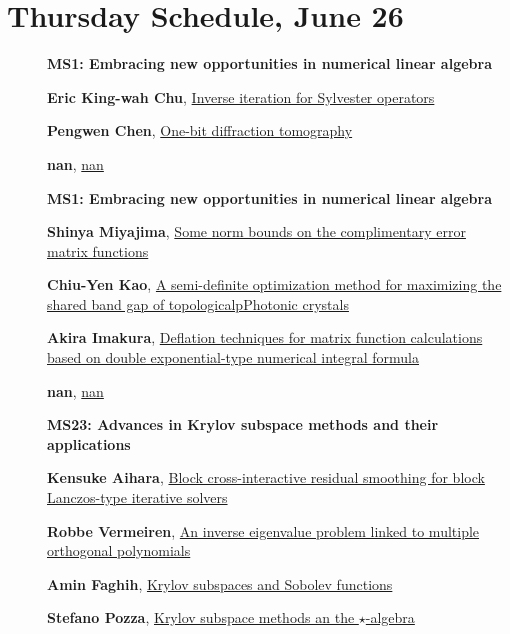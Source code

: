 \documentclass[ILAS2025-program.tex]{subfiles}
\begin{document}
\section*{Thursday Schedule, June 26 }
        
        \begin{description}
    \item[] {\color{mstitle}\textbf{MS1: Embracing new opportunities in numerical linear algebra}} 
    \item[] \hypertarget{up0304}{}\textbf{Eric King-wah Chu}, \hyperlink{down0304}{Inverse iteration for Sylvester operators
}
        \item[] \hypertarget{up0305}{}\textbf{Pengwen Chen}, \hyperlink{down0305}{One-bit diffraction tomography}
        \item[] \hypertarget{up0306}{}\textbf{nan}, \hyperlink{down0306}{nan}
        \end{description}
    \begin{description}
    \item[] {\color{mstitle}\textbf{MS1: Embracing new opportunities in numerical linear algebra}} 
    \item[] \hypertarget{up0347}{}\textbf{Shinya Miyajima}, \hyperlink{down0347}{Some norm bounds on the complimentary error matrix functions}
        \item[] \hypertarget{up0348}{}\textbf{Chiu-Yen Kao}, \hyperlink{down0348}{A semi-definite optimization method for maximizing the shared band gap of topologicalpPhotonic crystals}
        \item[] \hypertarget{up0349}{}\textbf{Akira Imakura}, \hyperlink{down0349}{Deflation techniques for matrix function calculations based on double exponential-type numerical integral formula}
        \item[] \hypertarget{up0350}{}\textbf{nan}, \hyperlink{down0350}{nan}
        \end{description}
    \begin{description}
    \item[] {\color{mstitle}\textbf{MS23: Advances in Krylov subspace methods and their applications}} 
    \item[] \hypertarget{up0391}{}\textbf{Kensuke Aihara}, \hyperlink{down0391}{Block cross-interactive residual smoothing for block Lanczos-type iterative solvers}
        \item[] \hypertarget{up0392}{}\textbf{Robbe Vermeiren}, \hyperlink{down0392}{An inverse eigenvalue problem linked to multiple orthogonal polynomials
}
        \item[] \hypertarget{up0393}{}\textbf{Amin Faghih}, \hyperlink{down0393}{Krylov subspaces and Sobolev functions}
        \item[] \hypertarget{up0394}{}\textbf{Stefano Pozza}, \hyperlink{down0394}{Krylov subspace methods an the $\star$-algebra}
        \end{description}
\end{document}
